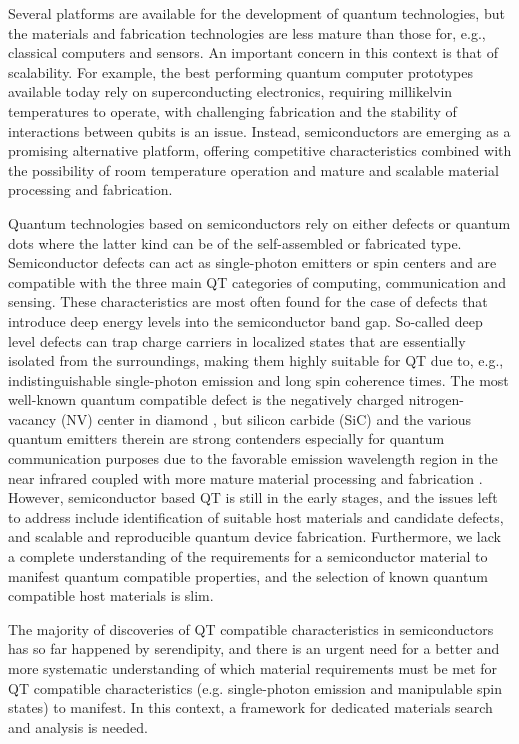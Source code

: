 \documentclass[superscriptaddress,unsortedaddress,
 amsmath,amssymb,
 aps,
]{revtex4-2}
\begin{document}
Several platforms are available for the development of quantum technologies, but the materials and fabrication technologies are less mature than those for, e.g., classical computers and sensors. 
An important concern in this context is that of scalability. 
For example, the best performing quantum computer prototypes available today rely on superconducting electronics, requiring millikelvin temperatures to operate, with challenging fabrication and the stability of interactions between qubits is an issue. Instead, semiconductors are emerging as a promising alternative platform, offering competitive characteristics combined with the possibility of room temperature operation and mature and scalable material processing and fabrication.  

Quantum technologies based on semiconductors rely on either defects or quantum dots where the latter kind can be of the self-assembled or fabricated type. 
Semiconductor defects can act as single-photon emitters or spin centers and are compatible with the three main QT categories of computing, communication and sensing.  
These characteristics are most often found for the case of defects that introduce deep energy levels into the semiconductor band gap. So-called deep level defects can trap charge carriers in localized states that are essentially isolated from the surroundings, making them highly suitable for QT due to, e.g., indistinguishable single-photon emission and long spin coherence times. 
The most well-known quantum compatible defect is the negatively charged nitrogen-vacancy (NV) center in diamond \cite{Doherty_2013}, but silicon carbide (SiC) and the various quantum emitters therein are strong contenders especially for quantum communication purposes due to the favorable emission wavelength region in the near infrared coupled with more mature material processing and fabrication \cite{Bathen2021}. 
However, semiconductor based QT is still in the early stages, and the issues left to address include identification of suitable host materials and candidate defects, and scalable and reproducible quantum device fabrication. 
Furthermore, we lack a complete understanding of the requirements for a semiconductor material to manifest quantum compatible properties,  
and the selection of known quantum compatible host materials is slim. 

The majority of discoveries of QT compatible characteristics in semiconductors has so far happened by serendipity, and there is an urgent need for a better and more systematic understanding of which material requirements must be met for QT compatible characteristics (e.g. single-photon emission and manipulable spin states) to manifest. In this context, a framework for dedicated materials search and analysis is needed. 
\end{document}

